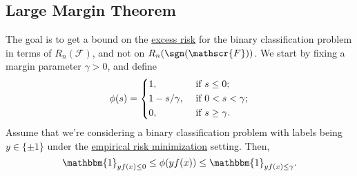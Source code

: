 \subsection{Large Margin Theorem}
The goal is to get a bound on the \hyperref[def:excess-risk]{excess risk} for the binary classification problem in terms of \(R_n(\mathscr{F} )\), and not on \(R_n(\sgn (\mathscr{F} ))\). We start by fixing a margin parameter \(\gamma > 0\), and define
\[
	\phi (s) = \begin{dcases}
		1,               & \text{ if } s \leq 0 ;        \\
		1 - s / \gamma , & \text{ if } 0 < s < \gamma  ; \\
		0 ,              & \text{ if } s \geq \gamma .
	\end{dcases}
\]
Assume that we're considering a binary classification problem with labels being \(y \in \{ \pm 1 \} \) under the \hyperref[prb:ERM]{empirical risk minimization} setting. Then,
\[
	\mathbbm{1}_{y f(x) \leq 0}
	\leq \phi (y f(x))
	\leq \mathbbm{1}_{y f(x) \leq \gamma } .
\]
\begin{center}
\end{center}

